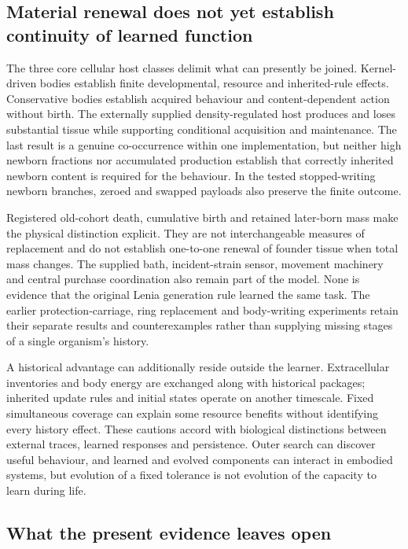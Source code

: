 \subsection*{Material renewal does not yet establish continuity of learned function}

The three core cellular host classes delimit what can presently be joined. Kernel-driven bodies establish finite developmental, resource and inherited-rule effects. Conservative bodies establish acquired behaviour and content-dependent action without birth. The externally supplied density-regulated host produces and loses substantial tissue while supporting conditional acquisition and maintenance. The last result is a genuine co-occurrence within one implementation, but neither high newborn fractions nor accumulated production establish that correctly inherited newborn content is required for the behaviour. In the tested stopped-writing newborn branches, zeroed and swapped payloads also preserve the finite outcome.

Registered old-cohort death, cumulative birth and retained later-born mass make the physical distinction explicit. They are not interchangeable measures of replacement and do not establish one-to-one renewal of founder tissue when total mass changes. The supplied bath, incident-strain sensor, movement machinery and central purchase coordination also remain part of the model. None is evidence that the original Lenia generation rule learned the same task. The earlier protection-carriage, ring replacement and body-writing experiments retain their separate results and counterexamples rather than supplying missing stages of a single organism's history.

A historical advantage can additionally reside outside the learner. Extracellular inventories and body energy are exchanged along with historical packages; inherited update rules and initial states operate on another timescale. Fixed simultaneous coverage can explain some resource benefits without identifying every history effect. These cautions accord with biological distinctions between external traces, learned responses and persistence\cite{reid,kramar2021,boisseau,reiber}. Outer search can discover useful behaviour\cite{hamon}, and learned and evolved components can interact in embodied systems\cite{gupta2021}, but evolution of a fixed tolerance is not evolution of the capacity to learn during life.

\subsection*{What the present evidence leaves open}

